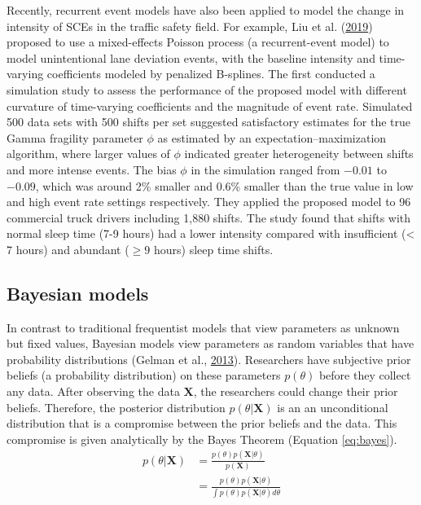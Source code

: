 \documentclass[12pt]{book}
\numberwithin{equation}{chapter}
\begin{document}
Recently, recurrent event models have also been applied to model the change in intensity of SCEs in the traffic safety field. For example, Liu et al. (\protect\hyperlink{ref-liu2019assessing}{2019}) proposed to use a mixed-effects Poisson process (a recurrent-event model) to model unintentional lane deviation events, with the baseline intensity and time-varying coefficients modeled by penalized B-splines. The first conducted a simulation study to assess the performance of the proposed model with different curvature of time-varying coefficients and the magnitude of event rate. Simulated 500 data sets with 500 shifts per set suggested satisfactory estimates for the true Gamma fragility parameter \(\phi\) as estimated by an expectation--maximization algorithm, where larger values of \(\phi\) indicated greater heterogeneity between shifts and more intense events. The bias \(\phi\) in the simulation ranged from \(-0.01\) to \(-0.09\), which was around 2\% smaller and 0.6\% smaller than the true value in low and high event rate settings respectively. They applied the proposed model to 96 commercial truck drivers including 1,880 shifts. The study found that shifts with normal sleep time (7-9 hours) had a lower intensity compared with insufficient (\textless{} 7 hours) and abundant (\(\geq 9\) hours) sleep time shifts.

\hypertarget{bayesian-models}{%
\subsection{Bayesian models}\label{bayesian-models}}

In contrast to traditional frequentist models that view parameters as unknown but fixed values, Bayesian models view parameters as random variables that have probability distributions (Gelman et al., \protect\hyperlink{ref-gelman2013bayesian}{2013}). Researchers have subjective prior beliefs (a probability distribution) on these parameters \(p(\theta)\) before they collect any data. After observing the data \(\mathbf{X}\), the researchers could change their prior beliefs. Therefore, the posterior distribution \(p(\theta | \mathbf{X})\) is an an unconditional distribution that is a compromise between the prior beliefs and the data. This compromise is given analytically by the Bayes Theorem (Equation \eqref{eq:bayes}).
\begin{equation}
\begin{split}
p(\theta | \mathbf{X}) & = \frac{p(\theta)p(\mathbf{X}|\theta)}{p(\mathbf{X})} \\
 & = \frac{p(\theta)p(\mathbf{X}|\theta )}{\int p(\theta)p(\mathbf{X}|\theta)d\theta}
\label{eq:bayes}
\end{split}
\end{equation}
\end{document}
